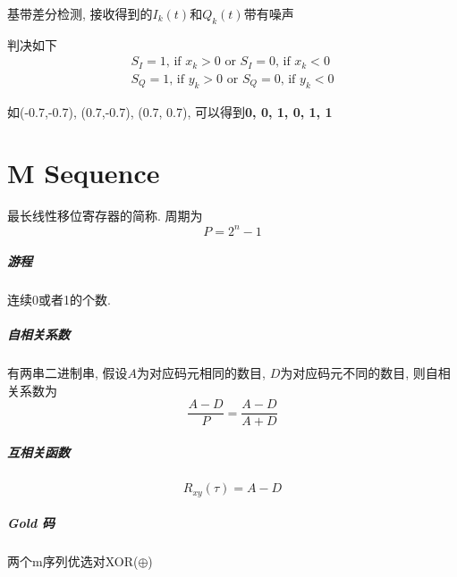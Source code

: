 \documentclass[a4paper]{report}
\begin{document}
基带差分检测, 接收得到的$I_k(t)$和$Q_k(t)$带有噪声

判决如下
\begin{align*}
	S_I=1\text{, if } x_k>0 \text{ or } S_I=0\text{, if } x_k<0 \\
	S_Q=1\text{, if } y_k>0 \text{ or } S_Q=0\text{, if } y_k<0
\end{align*}

如(-0.7,-0.7), (0.7,-0.7), (0.7, 0.7), 可以得到\textbf{0, 0, 1, 0, 1, 1}




\section{M Sequence}
最长线性移位寄存器的简称. 周期为
\begin{equation}
	P=2^n-1
\end{equation}

\subparagraph{游程} 连续0或者1的个数. 

\subparagraph{自相关系数} 有两串二进制串, 假设$A$为对应码元相同的数目, $D$为对应码元不同的数目, 则自相关系数为
\begin{equation}
	\frac{A-D}{P}=\frac{A-D}{A+D}
\end{equation}

\subparagraph{互相关函数}
\begin{equation}
	R_{xy}(\tau)=A-D
\end{equation}
\subparagraph{Gold 码} 两个m序列优选对XOR($\oplus$)
\end{document}
